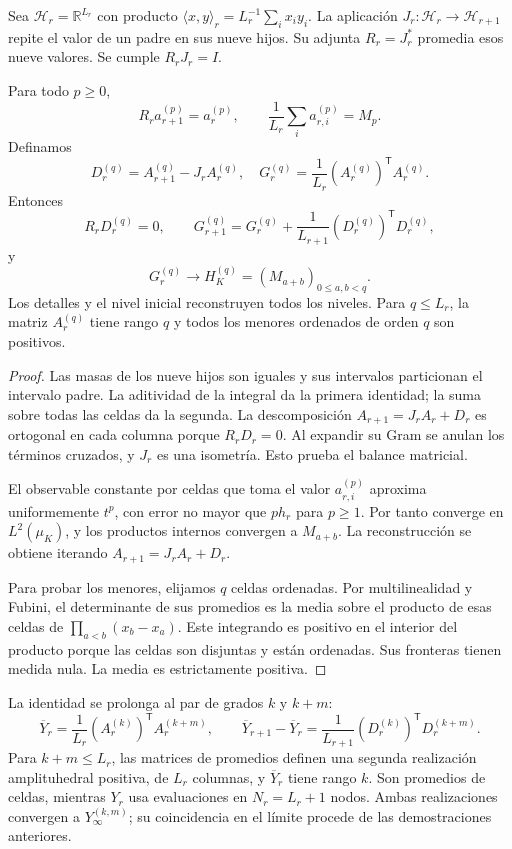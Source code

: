 Sea \(\mathcal H_r=\mathbb R^{L_r}\) con producto
\(\langle x,y\rangle_r=L_r^{-1}\sum_i x_i y_i\). La aplicación
\(J_r:\mathcal H_r\to\mathcal H_{r+1}\) repite el valor de un
padre en sus nueve hijos. Su adjunta \(R_r=J_r^*\) promedia esos
nueve valores. Se cumple \(R_rJ_r=I\).

\begin{theorem}
\label{thm:dim-cell-balance}
Para todo \(p\geq0\),
\[
 R_r a_{r+1}^{(p)}=a_r^{(p)},\qquad
 \frac1{L_r}\sum_i a_{r,i}^{(p)}=M_p.
\]
Definamos
\[
 D_r^{(q)}=A_{r+1}^{(q)}-J_rA_r^{(q)},\quad
 G_r^{(q)}=\frac1{L_r}(A_r^{(q)})^{\mathsf T}A_r^{(q)}.
\]
Entonces
\[
 R_rD_r^{(q)}=0,\qquad
 G_{r+1}^{(q)}=G_r^{(q)}+
       \frac1{L_{r+1}}(D_r^{(q)})^{\mathsf T}D_r^{(q)},
\]
y
\[
 G_r^{(q)}\longrightarrow H_K^{(q)}=(M_{a+b})_{0\leq a,b<q}.
\]
Los detalles y el nivel inicial reconstruyen todos los niveles. Para
\(q\leq L_r\), la matriz \(A_r^{(q)}\) tiene rango \(q\) y
todos los menores ordenados de orden \(q\) son positivos.
\end{theorem}
\begin{proof}
Las masas de los nueve hijos son iguales y sus intervalos particionan
el intervalo padre. La aditividad de la integral da la primera identidad;
la suma sobre todas las celdas da la segunda. La descomposición
\(A_{r+1}=J_rA_r+D_r\) es ortogonal en cada columna porque
\(R_rD_r=0\). Al expandir su Gram se anulan los términos cruzados,
y \(J_r\) es una isometría. Esto prueba el balance matricial.

El observable constante por celdas que toma el valor \(a_{r,i}^{(p)}\)
aproxima uniformemente \(t^p\), con error no mayor que \(p h_r\)
para \(p\geq1\). Por tanto converge en \(L^2(\mu_K)\), y los
productos internos convergen a \(M_{a+b}\). La reconstrucción se
obtiene iterando \(A_{r+1}=J_rA_r+D_r\).

Para probar los menores, elijamos \(q\) celdas ordenadas. Por
multilinealidad y Fubini, el determinante de sus promedios es la media
sobre el producto de esas celdas de
\(\prod_{a<b}(x_b-x_a)\). Este integrando es positivo en el
interior del producto porque las celdas son disjuntas y están ordenadas.
Sus fronteras tienen medida nula. La media es estrictamente positiva.
\end{proof}

La identidad se prolonga al par de grados \(k\) y \(k+m\):
\[
 \overline Y_r=\frac1{L_r}(A_r^{(k)})^{\mathsf T}A_r^{(k+m)},
 \qquad
 \overline Y_{r+1}-\overline Y_r
 =\frac1{L_{r+1}}(D_r^{(k)})^{\mathsf T}D_r^{(k+m)}.
\]
Para \(k+m\leq L_r\), las matrices de promedios definen una
segunda realización amplituhedral positiva, de \(L_r\) columnas,
y \(\overline Y_r\) tiene rango \(k\). Son promedios de celdas,
mientras \(Y_r\) usa evaluaciones en \(N_r=L_r+1\) nodos. Ambas
realizaciones convergen a \(Y_\infty^{(k,m)}\); su coincidencia
en el límite procede de las demostraciones anteriores.

